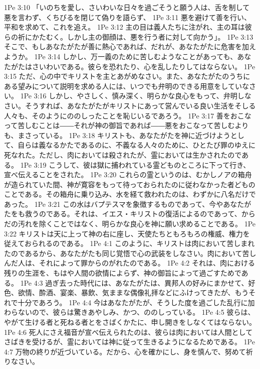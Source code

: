 1Pe 3:10  「いのちを愛し、さいわいな日々を過ごそうと願う人は、舌を制して悪を言わず、くちびるを閉じて偽りを語らず、
1Pe 3:11  悪を避けて善を行い、平和を求めて、これを追え。
1Pe 3:12  主の目は義人たちに注がれ、主の耳は彼らの祈にかたむく。しかし主の御顔は、悪を行う者に対して向かう」。
1Pe 3:13  そこで、もしあなたがたが善に熱心であれば、だれが、あなたがたに危害を加えようか。
1Pe 3:14  しかし、万一義のために苦しむようなことがあっても、あなたがたはさいわいである。彼らを恐れたり、心を乱したりしてはならない。
1Pe 3:15  ただ、心の中でキリストを主とあがめなさい。また、あなたがたのうちにある望みについて説明を求める人には、いつでも弁明のできる用意をしていなさい。
1Pe 3:16  しかし、やさしく、慎み深く、明らかな良心をもって、弁明しなさい。そうすれば、あなたがたがキリストにあって営んでいる良い生活をそしる人々も、そのようにののしったことを恥じいるであろう。
1Pe 3:17  善をおこなって苦しむことは――それが神の御旨であれば――悪をおこなって苦しむよりも、まさっている。
1Pe 3:18  キリストも、あなたがたを神に近づけようとして、自らは義なるかたであるのに、不義なる人々のために、ひとたび罪のゆえに死なれた。ただし、肉においては殺されたが、霊においては生かされたのである。
1Pe 3:19  こうして、彼は獄に捕われている霊どものところに下って行き、宣べ伝えることをされた。
1Pe 3:20  これらの霊というのは、むかしノアの箱舟が造られていた間、神が寛容をもって待っておられたのに従わなかった者どものことである。その箱舟に乗り込み、水を経て救われたのは、わずかに八名だけであった。
1Pe 3:21  この水はバプテスマを象徴するものであって、今やあなたがたをも救うのである。それは、イエス・キリストの復活によるのであって、からだの汚れを除くことではなく、明らかな良心を神に願い求めることである。
1Pe 3:22  キリストは天に上って神の右に座し、天使たちともろもろの権威、権力を従えておられるのである。
1Pe 4:1  このように、キリストは肉において苦しまれたのであるから、あなたがたも同じ覚悟で心の武装をしなさい。肉において苦しんだ人は、それによって罪からのがれたのである。
1Pe 4:2  それは、肉における残りの生涯を、もはや人間の欲情によらず、神の御旨によって過ごすためである。
1Pe 4:3  過ぎ去った時代には、あなたがたは、異邦人の好みにまかせて、好色、欲情、酔酒、宴楽、暴飲、気ままな偶像礼拝などにふけってきたが、もうそれで十分であろう。
1Pe 4:4  今はあなたがたが、そうした度を過ごした乱行に加わらないので、彼らは驚きあやしみ、かつ、ののしっている。
1Pe 4:5  彼らは、やがて生ける者と死ねる者とをさばくかたに、申し開きをしなくてはならない。
1Pe 4:6  死人にさえ福音が宣べ伝えられたのは、彼らは肉においては人間としてさばきを受けるが、霊においては神に従って生きるようになるためである。
1Pe 4:7  万物の終りが近づいている。だから、心を確かにし、身を慎んで、努めて祈りなさい。
